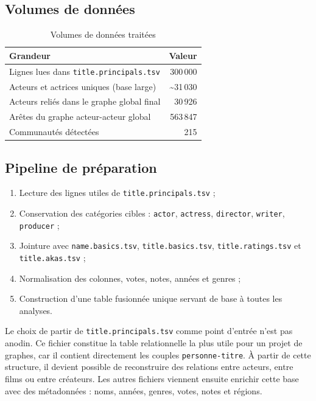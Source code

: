 \documentclass[a4paper,12pt]{article}
\newcommand{\file}[1]{\texttt{\color{imdbblue}#1}}
\newcommand{\code}[1]{\texttt{\small\color{imdbslate}#1}}
\begin{document}
\subsection{Volumes de données}

\begin{table}[H]
\centering
\small
\begin{tabularx}{0.85\linewidth}{X r}
\toprule
\rowcolor{imdblight}
\textbf{Grandeur} & \textbf{Valeur} \\
\midrule
Lignes lues dans \file{title.principals.tsv} & 300\,000 \\
Acteurs et actrices uniques (base large) & \textasciitilde 31\,030 \\
Acteurs reliés dans le graphe global final & 30\,926 \\
Arêtes du graphe acteur-acteur global & 563\,847 \\
Communautés détectées & 215 \\
\bottomrule
\end{tabularx}
\caption{Volumes de données traitées}
\end{table}
\newpage
\subsection{Pipeline de préparation}

\begin{enumerate}[leftmargin=1.4cm, itemsep=4pt]
  \item Lecture des lignes utiles de \file{title.principals.tsv} ;
  \item Conservation des catégories cibles : \code{actor}, \code{actress}, \code{director}, \code{writer}, \code{producer} ;
  \item Jointure avec \file{name.basics.tsv}, \file{title.basics.tsv}, \file{title.ratings.tsv} et \file{title.akas.tsv} ;
  \item Normalisation des colonnes, votes, notes, années et genres ;
  \item Construction d'une table fusionnée unique servant de base à toutes les analyses.
\end{enumerate}

Le choix de partir de \file{title.principals.tsv} comme point d'entrée n'est pas anodin. Ce fichier constitue la table relationnelle la plus utile pour un projet de graphes, car il contient directement les couples \code{personne-titre}. À partir de cette structure, il devient possible de reconstruire des relations entre acteurs, entre films ou entre créateurs. Les autres fichiers viennent ensuite enrichir cette base avec des métadonnées : noms, années, genres, votes, notes et régions.
\end{document}
